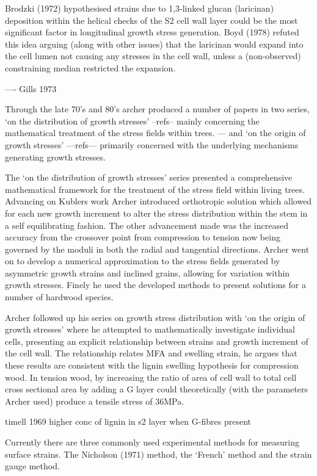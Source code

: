 \documentclass{article}
\begin{document}
Brodzki (1972) hypothesised strains due to 1,3-linked glucan (laricinan)
deposition within the helical checks of the S2 cell wall layer could be the
most significant factor in longitudinal growth stress generation. Boyd (1978)
refuted this idea arguing (along with other issues) that the laricinan would
expand into the cell lumen not causing any stresses in the cell wall, unless a
(non-observed) constraining median restricted the expansion.

---- Gills 1973

Through the late 70's and 80's archer produced a number of papers in two series,
`on the distribution of growth stresses' --refs-- mainly concerning the
mathematical treatment of the stress fields within trees. --- and `on the
origin of growth stresses' ---refs--- primarily concerned with the underlying
mechanisms generating growth stresses.

The `on the distribution of growth stresses' series presented a comprehensive
mathematical framework for the treatment of the stress field within living
trees. Advancing on Kublers work Archer introduced orthotropic solution which
allowed for each new growth increment to alter the stress distribution within
the stem in a self equilibrating fashion. The other advancement made was the
increased accuracy from the crossover point from compression to tension now being
governed by the moduli in both the radial and tangential directions.
Archer went on to develop a numerical approximation to the stress fields
generated by asymmetric growth strains and inclined grains, allowing for
variation within growth stresses. Finely he used the developed methods to
present solutions for a number of hardwood species.

Archer followed up his series on growth stress distribution with `on the origin
of growth stresses' where he attempted to mathematically investigate individual
cells, presenting an explicit relationship between strains and growth
increment of the cell wall. The relationship relates MFA and swelling strain,
he argues that these results are consistent with the lignin swelling hypothesis
for compression wood. In tension wood, by increasing the ratio of area of cell
wall to total cell cross sectional area by adding a G layer could theoretically
(with the parameters Archer used) produce a tensile stress of 36MPa.

timell 1969 higher conc of lignin in s2 layer when G-fibres present

Currently there are three commonly used experimental methods for measuring
surface strains. The Nicholson (1971) method, the `French' method and the strain
gauge method.
\end{document}
